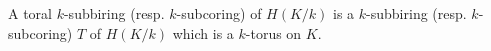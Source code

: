 A toral $k$-subbiring (resp. $k$-subcoring) of $H(K/k)$ is a $k$-subbiring (resp. $k$-subcoring) $T$ of $H(K/k)$ which is a $k$-torus on $K$.
